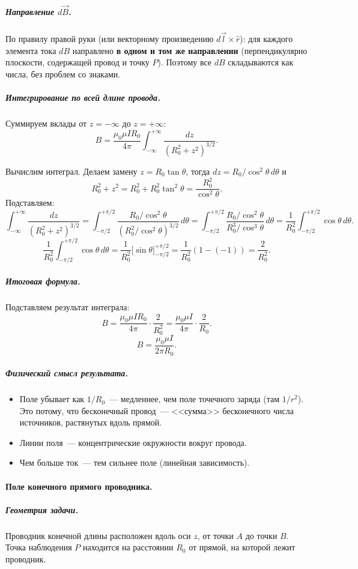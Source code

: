 \documentclass[12pt]{article}
\begin{document}
\subparagraph{Направление $d\vec{B}$.}
По правилу правой руки (или векторному произведению $d\vec{l}\times\hat{r}$):
для каждого элемента тока $dB$ направлено \textbf{в одном и том же направлении}
(перпендикулярно плоскости, содержащей провод и точку $P$). Поэтому все
$dB$ складываются как числа, без проблем со знаками.

\subparagraph{Интегрирование по всей длине провода.}
Суммируем вклады от $z = -\infty$ до $z = +\infty$:
\[
    B = \frac{\mu_0 \mu I R_0}{4\pi}\int_{-\infty}^{+\infty}
    \frac{dz}{(R_0^2 + z^2)^{3/2}}.
\]

Вычислим интеграл. Делаем замену $z = R_0\tan\theta$, тогда
$dz = R_0/\cos^2\theta\,d\theta$ и
\[
    R_0^2 + z^2 = R_0^2 + R_0^2\tan^2\theta = \frac{R_0^2}{\cos^2\theta}.
\]
Подставляем:
\[
    \int_{-\infty}^{+\infty}\frac{dz}{(R_0^2+z^2)^{3/2}}
    = \int_{-\pi/2}^{+\pi/2}
    \frac{R_0/\cos^2\theta}{\left(R_0^2/\cos^2\theta\right)^{3/2}}\,d\theta
    = \int_{-\pi/2}^{+\pi/2}
    \frac{R_0/\cos^2\theta}{R_0^3/\cos^3\theta}\,d\theta
    = \frac{1}{R_0^2}\int_{-\pi/2}^{+\pi/2}\cos\theta\,d\theta.
\]
\[
    \frac{1}{R_0^2}\int_{-\pi/2}^{+\pi/2}\cos\theta\,d\theta
    = \frac{1}{R_0^2}\Big[\sin\theta\Big]_{-\pi/2}^{+\pi/2}
    = \frac{1}{R_0^2}(1 - (-1)) = \frac{2}{R_0^2}.
\]

\subparagraph{Итоговая формула.}
Подставляем результат интеграла:
\[
    B = \frac{\mu_0 \mu I R_0}{4\pi}\cdot\frac{2}{R_0^2}
    = \frac{\mu_0 \mu I}{4\pi}\cdot\frac{2}{R_0}.
\]
\[
    \boxed{B = \frac{\mu_0 \mu I}{2\pi R_0}.}
\]

\subparagraph{Физический смысл результата.}
\begin{itemize}
    \item Поле убывает как $1/R_0$~--- медленнее, чем поле точечного заряда
          (там $1/r^2$). Это потому, что бесконечный провод~--- <<сумма>>
          бесконечного числа источников, растянутых вдоль прямой.
    \item Линии поля~--- концентрические окружности вокруг провода.
    \item Чем больше ток~--- тем сильнее поле (линейная зависимость).
\end{itemize}

\paragraph{Поле конечного прямого проводника.}

\subparagraph{Геометрия задачи.}
Проводник конечной длины расположен вдоль оси $z$, от точки $A$ до точки $B$.
Точка наблюдения $P$ находится на расстоянии $R_0$ от прямой, на которой лежит
проводник.
\end{document}
